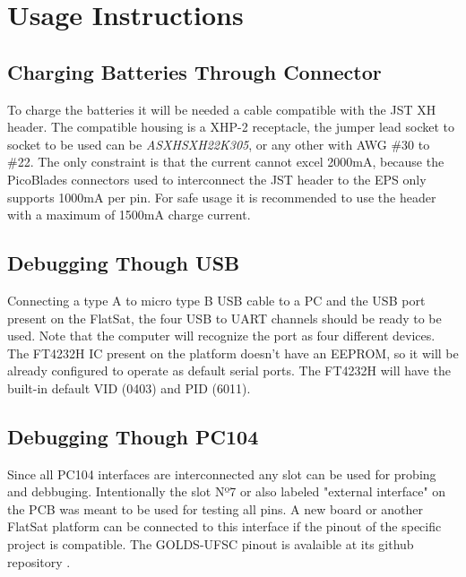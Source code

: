 %
%
%
%
%

%
%
%
%
%
%

\chapter{Usage Instructions} \label{ch:instructions}

\section{Charging Batteries Through Connector}

To charge the batteries it will be needed a cable compatible with the JST XH header. The compatible housing is a XHP-2 receptacle, the jumper lead socket to socket to be used can be \textit{ASXHSXH22K305}, or any other with AWG \#30 to \#22. The only constraint is that the current cannot excel 2000mA, because the PicoBlades connectors used to interconnect the JST header to the EPS only supports 1000mA per pin. For safe usage it is recommended to use the header with a maximum of 1500mA charge current.

\section{Debugging Though USB}

Connecting a type A to micro type B USB cable to a PC and the USB port present on the FlatSat, the four USB to UART channels should be ready to be used. Note that the computer will recognize the port as four different devices. The FT4232H IC present on the platform  doesn't have an EEPROM, so it will be already configured to operate as default serial ports. The FT4232H will have the built-in default VID (0403) and PID (6011).

\section{Debugging Though PC104}

Since all PC104 interfaces are interconnected any slot can be used for probing and debbuging. Intentionally the slot Nº7 or also labeled "external interface" on the PCB was meant to be used for testing all pins. A new board or another FlatSat platform can be connected to this interface if the pinout of the specific project is compatible. The GOLDS-UFSC pinout is avalaible at its github repository \cite{golds-ufsc}.